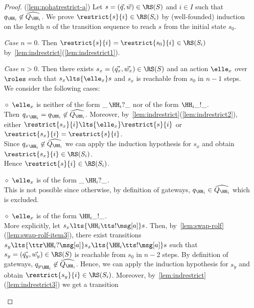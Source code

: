 \begin{proof}
{ (\ref{lem:nohatrestrict-a})}
Let $s = (\vec{q},\vec{w}) \in \RS(S)$ and $i \in I$ such that ${q}_{\HH_i}\not\in\widehat{Q_{\HH_i}}$.
We prove $\restrict{s}{i}\in \RS(S_i)$  by (well-founded) induction on the length $n$ of the transition sequence to reach $s$ from the initial state $s_0$.

{\em Case $n=0$}. Then $\restrict{s}{i} = \restrict{s_0}{i} \in \RS(S_i)$
by~\cref{lem:indrestrict}(\ref{lem:indrestrict1}).


{\em Case $n>0$}.
Then there exists $s_x = (\vec{q_x},\vec{w_x}) \in \RS(S)$ and an action $\elle_x$ over $\roles$
such that $s_x\lts{\elle_x}s$ and $s_x$ is reachable from $s_0$ in $n-1$ steps. We consider the following cases:

\begin{description}
%
\item
\underline{$\diamond$}
$\elle_x$ is neither of the form $\_\,\HH_i?\_$ nor of the form $\HH_i\_!\_$.\\
Then ${q_x}_{\HH_i}={q}_{\HH_i}\not\in\widehat{Q_{\HH_i}}$.
Moreover, by~\cref{lem:indrestrict}(\ref{lem:indrestrict2}),
either $\restrict{s_x}{i}\lts{\elle_x}\restrict{s}{i}$ or  $\restrict{s_x}{i}=\restrict{s}{i}$.\\
Since ${q_x}_{\HH_i}\not\in\widehat{Q_{\HH_i}}$ we can apply the induction hypothesis for $s_x$ and obtain $\restrict{s_x}{i}\in \RS(S_i)$.\\
Hence $\restrict{s}{i}\in \RS(S_i)$.
%
\item
\underline{$\diamond$}
$\elle_x$ is of the form $\_\,\HH_i?\_$.\\
This is not possible since otherwise,
by definition of gateways,
${q}_{\HH_i}\in\widehat{Q_{\HH_i}}$ which is excluded. 
%
\item
\underline{$\diamond$}
$\elle_x$ is of the form $\HH_i\_!\_$.\\
More explicitly, let $s_x\lts{\HH_i\tts!\msg[a]}s$.
Then, by~\cref{lem:swap-rolf}(\ref{lem:swap-rolf-item3}), there exist
transitions
$s_y \lts{\ttr\HH_i?\msg[a]}s_x\lts{\HH_i\tts!\msg[a]}s$
such that $s_y = (\vec{q_y},\vec{w_y})\in \RS(S)$ is reachable from $s_0$ in $n-2$ steps. By definition of gateways, ${q_y}_{\HH_i} \not\in\widehat{Q_{\HH_i}}$.
Hence, we can apply the induction hypothesis for $s_y$ and obtain $\restrict{s_y}{i}\in \RS(S_i)$.
Moreover, by~\cref{lem:indrestrict}(\ref{lem:indrestrict3}) we get a transition

\end{description}
\end{proof}

